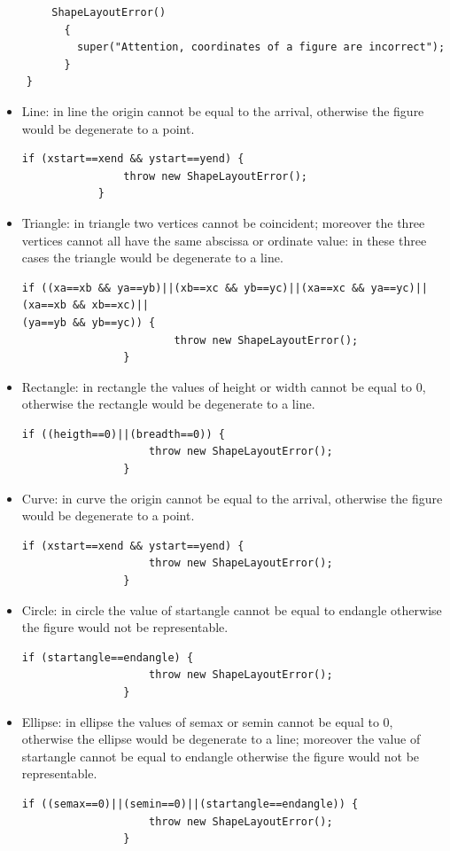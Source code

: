 \documentclass[a4paper]{article}
\begin{document}
\begin{itemize}
\begin{verbatim}
		ShapeLayoutError()
		  {
		    super("Attention, coordinates of a figure are incorrect");
		  }
	}
\end{verbatim}
\vspace{1\baselineskip}
\begin{itemize}
\item Line: in line the origin cannot be equal to the arrival, otherwise the figure would be degenerate to a point.
\begin{verbatim}
if (xstart==xend && ystart==yend) {
				throw new ShapeLayoutError();
			}
\end{verbatim}
\vspace{1\baselineskip}
\item Triangle: in triangle two vertices cannot be coincident; moreover the three vertices cannot all have the same abscissa or ordinate value: in these three cases the triangle would be degenerate to a line.
\begin{verbatim}
if ((xa==xb && ya==yb)||(xb==xc && yb==yc)||(xa==xc && ya==yc)||(xa==xb && xb==xc)||
(ya==yb && yb==yc)) {
						throw new ShapeLayoutError();
				}
\end{verbatim}
\vspace{1\baselineskip}
\item Rectangle: in rectangle the values of height or width cannot be equal to 0, otherwise the rectangle would be degenerate to a line.
\begin{verbatim}
if ((heigth==0)||(breadth==0)) {
					throw new ShapeLayoutError();
				}
\end{verbatim}
\vspace{1\baselineskip}
\item Curve: in curve the origin cannot be equal to the arrival, otherwise the figure would be degenerate to a point.
\begin{verbatim}
if (xstart==xend && ystart==yend) {
					throw new ShapeLayoutError();
				}
\end{verbatim}
\vspace{1\baselineskip}
\item Circle: in circle the value of startangle cannot be equal to endangle otherwise the figure would not be representable.
\begin{verbatim}
if (startangle==endangle) {
					throw new ShapeLayoutError();
				}
\end{verbatim}
\vspace{1\baselineskip}
\item Ellipse: in ellipse the values of semax or semin cannot be equal to 0, otherwise the ellipse would be degenerate to a line; moreover the value of startangle cannot be equal to endangle otherwise the figure would not be representable.
\begin{verbatim}
if ((semax==0)||(semin==0)||(startangle==endangle)) {
					throw new ShapeLayoutError();
				}
\end{verbatim} 
\end{itemize}
\end{itemize}
\end{document}
